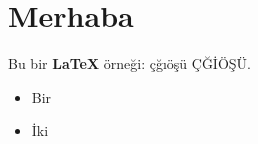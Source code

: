 \documentclass{article}
\begin{document}
\section{Merhaba}
Bu bir \textbf{LaTeX} örneği: çğıöşü ÇĞİÖŞÜ.
\begin{itemize}\item Bir \item İki\end{itemize}
\end{document}
